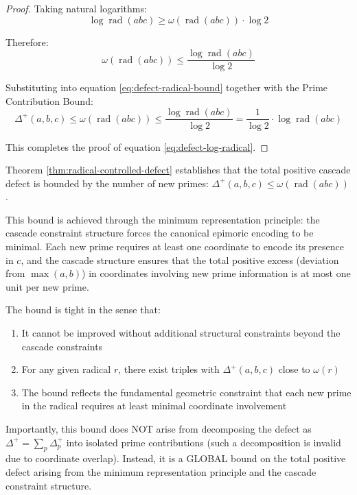 \begin{proof}
Taking natural logarithms:
\begin{equation}
\log \operatorname{rad}(abc) \geq \omega(\operatorname{rad}(abc)) \cdot \log 2
\end{equation}

Therefore:
\begin{equation}
\omega(\operatorname{rad}(abc)) \leq \frac{\log \operatorname{rad}(abc)}{\log 2}
\end{equation}

Substituting into equation \eqref{eq:defect-radical-bound} together with the Prime Contribution Bound:
\begin{equation}
\Delta^{+}(a,b,c) \leq \omega(\operatorname{rad}(abc)) \leq \frac{\log \operatorname{rad}(abc)}{\log 2} = \frac{1}{\log 2} \cdot \log \operatorname{rad}(abc)
\end{equation}

This completes the proof of equation \eqref{eq:defect-log-radical}.

\end{proof}

\begin{remark}
Theorem \ref{thm:radical-controlled-defect} establishes that the total positive cascade defect is bounded by the number of new primes: $\Delta^{+}(a,b,c) \leq \omega(\operatorname{rad}(abc))$.

This bound is achieved through the minimum representation principle: the cascade constraint structure forces the canonical epimoric encoding to be minimal. Each new prime requires at least one coordinate to encode its presence in $c$, and the cascade structure ensures that the total positive excess (deviation from $\max(a,b)$) in coordinates involving new prime information is at most one unit per new prime.

The bound is tight in the sense that:
\begin{enumerate}
\item It cannot be improved without additional structural constraints beyond the cascade constraints
\item For any given radical $r$, there exist triples with $\Delta^{+}(a,b,c)$ close to $\omega(r)$
\item The bound reflects the fundamental geometric constraint that each new prime in the radical requires at least minimal coordinate involvement
\end{enumerate}

Importantly, this bound does NOT arise from decomposing the defect as $\Delta^{+} = \sum_p \Delta^{+}_p$ into isolated prime contributions (such a decomposition is invalid due to coordinate overlap). Instead, it is a GLOBAL bound on the total positive defect arising from the minimum representation principle and the cascade constraint structure.
\end{remark}

